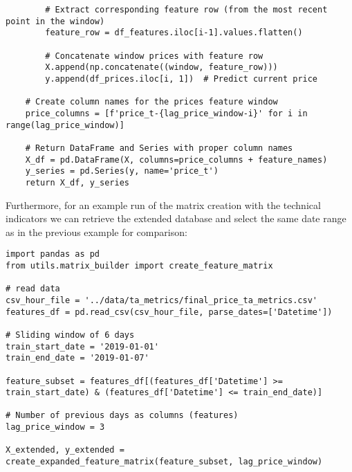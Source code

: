 \documentclass[12pt]{report} %
\begin{document}
\begin{lstlisting}
        # Extract corresponding feature row (from the most recent point in the window)
        feature_row = df_features.iloc[i-1].values.flatten()

        # Concatenate window prices with feature row
        X.append(np.concatenate((window, feature_row)))
        y.append(df_prices.iloc[i, 1])  # Predict current price

    # Create column names for the prices feature window
    price_columns = [f'price_t-{lag_price_window-i}' for i in range(lag_price_window)]

    # Return DataFrame and Series with proper column names
    X_df = pd.DataFrame(X, columns=price_columns + feature_names)
    y_series = pd.Series(y, name='price_t')
    return X_df, y_series
\end{lstlisting}

Furthermore, for an example run of the matrix creation with the technical indicators we can retrieve the extended database and select the same date range as in the previous example for comparison:
\begin{lstlisting}
import pandas as pd
from utils.matrix_builder import create_feature_matrix

# read data
csv_hour_file = '../data/ta_metrics/final_price_ta_metrics.csv'
features_df = pd.read_csv(csv_hour_file, parse_dates=['Datetime'])

# Sliding window of 6 days
train_start_date = '2019-01-01'
train_end_date = '2019-01-07'

feature_subset = features_df[(features_df['Datetime'] >= train_start_date) & (features_df['Datetime'] <= train_end_date)]

# Number of previous days as columns (features)
lag_price_window = 3

X_extended, y_extended = create_expanded_feature_matrix(feature_subset, lag_price_window)
\end{lstlisting}
\end{document}
